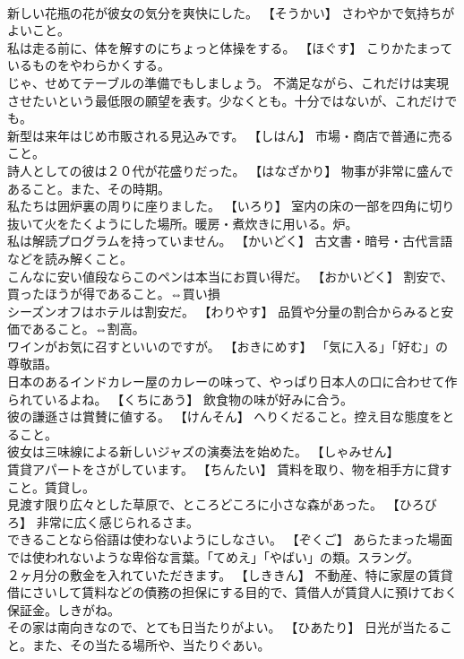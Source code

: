 \documentclass[8pt]{extreport}
\begin{document}
\begin{CJK}{UTF8}{min}
\\	新しい花瓶の花が彼女の気分を爽快にした。	【そうかい】 さわやかで気持ちがよいこと。
\\	私は走る前に、体を解すのにちょっと体操をする。	【ほぐす】 こりかたまっているものをやわらかくする。
\\	じゃ、せめてテーブルの準備でもしましょう。	不満足ながら、これだけは実現させたいという最低限の願望を表す。少なくとも。十分ではないが、これだけでも。
\\	新型は来年はじめ市販される見込みです。	【しはん】 市場・商店で普通に売ること。
\\	詩人としての彼は２０代が花盛りだった。	【はなざかり】 物事が非常に盛んであること。また、その時期。
\\	私たちは囲炉裏の周りに座りました。	【いろり】 室内の床の一部を四角に切り抜いて火をたくようにした場所。暖房・煮炊きに用いる。炉。
\\	私は解読プログラムを持っていません。	【かいどく】 古文書・暗号・古代言語などを読み解くこと。
\\	こんなに安い値段ならこのペンは本当にお買い得だ。	【おかいどく】 割安で、買ったほうが得であること。⇔買い損
\\	シーズンオフはホテルは割安だ。	【わりやす】 品質や分量の割合からみると安価であること。⇔割高。
\\	ワインがお気に召すといいのですが。	【おきにめす】 「気に入る」「好む」の尊敬語。
\\	日本のあるインドカレー屋のカレーの味って、やっぱり日本人の口に合わせて作られているよね。	【くちにあう】 飲食物の味が好みに合う。
\\	彼の謙遜さは賞賛に値する。	【けんそん】 へりくだること。控え目な態度をとること。
\\	彼女は三味線による新しいジャズの演奏法を始めた。	【しゃみせん】
\\	賃貸アパートをさがしています。	【ちんたい】 賃料を取り、物を相手方に貸すこと。賃貸し。
\\	見渡す限り広々とした草原で、ところどころに小さな森があった。	【ひろびろ】 非常に広く感じられるさま。
\\	できることなら俗語は使わないようにしなさい。	【ぞくご】 あらたまった場面では使われないような卑俗な言葉。「てめえ」「やばい」の類。スラング。
\\	２ヶ月分の敷金を入れていただきます。	【しききん】 不動産、特に家屋の賃貸借にさいして賃料などの債務の担保にする目的で、賃借人が賃貸人に預けておく保証金。しきがね。
\\	その家は南向きなので、とても日当たりがよい。	【ひあたり】 日光が当たること。また、その当たる場所や、当たりぐあい。

\end{CJK}
\end{document}
